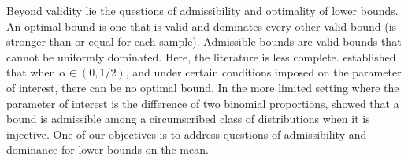 \documentclass{article}
\theoremstyle{definition}
\theoremstyle{remark}
\begin{document}

Beyond validity lie the questions of  admissibility and optimality of lower bounds. An optimal bound is one that is valid and dominates   every other valid bound (is stronger than or equal for each sample). Admissible bounds are valid bounds that cannot be uniformly dominated. Here, the literature is less complete. \cite{KabailaLloyd2000} established that when $\alpha \in (0, 1/2)$, and under certain conditions imposed on the parameter of interest, there can be no optimal bound. In the more limited setting where the parameter of interest is the difference of two binomial proportions, \cite{Wang2010} showed that a bound is admissible among a circumscribed  class of distributions when it is injective. One of our objectives is to address questions of admissibility and dominance for lower bounds on the mean.
\end{document}
